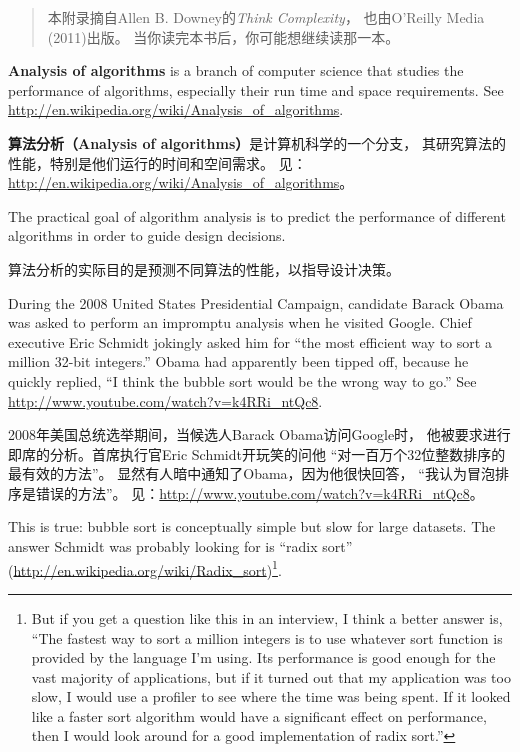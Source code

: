 \documentclass[10pt]{book}
\begin{document}
\begin{CJK}{UTF8}{gbsn}
\begin{quote}
本附录摘自Allen B. Downey的{\it Think Complexity}，
也由O'Reilly Media (2011)出版。
当你读完本书后，你可能想继续读那一本。
\end{quote}

{\bf Analysis of algorithms} is a branch of computer science that
studies the performance of algorithms, especially their run time and
space requirements.  See
\url{http://en.wikipedia.org/wiki/Analysis_of_algorithms}.
 

{\bf 算法分析（Analysis of algorithms）}是计算机科学的一个分支，
其研究算法的性能，特别是他们运行的时间和空间需求。
见：\url{http://en.wikipedia.org/wiki/Analysis_of_algorithms}。

The practical goal of algorithm analysis is to predict the performance
of different algorithms in order to guide design decisions.

算法分析的实际目的是预测不同算法的性能，以指导设计决策。

During the 2008 United States Presidential Campaign, candidate
Barack Obama was asked to perform an impromptu analysis when
he visited Google.  Chief executive Eric Schmidt jokingly asked him
for ``the most efficient way to sort a million 32-bit integers.''
Obama had apparently been tipped off, because he quickly
replied, ``I think the bubble sort would be the wrong way to go.''
See \url{http://www.youtube.com/watch?v=k4RRi_ntQc8}.

2008年美国总统选举期间，当候选人Barack Obama访问Google时，
他被要求进行即席的分析。首席执行官Eric Schmidt开玩笑的问他
``对一百万个32位整数排序的最有效的方法''。
显然有人暗中通知了Obama，因为他很快回答，
``我认为冒泡排序是错误的方法''。
见：\url{http://www.youtube.com/watch?v=k4RRi_ntQc8}。

This is true: bubble sort is conceptually simple but slow for
large datasets.  The answer Schmidt was probably looking for is
``radix sort'' (\url{http://en.wikipedia.org/wiki/Radix_sort})\footnote{
But if you get a question like this in an interview, I think
a better answer is, ``The fastest way to sort a million integers
is to use whatever sort function is provided by the language
I'm using.  Its performance is good enough for the vast majority
of applications, but if it turned out that my application was too
slow, I would use a profiler to see where the time was being
spent.  If it looked like a faster sort algorithm would have
a significant effect on performance, then I would look
around for a good implementation of radix sort.''}.


\end{CJK}
\end{document}
